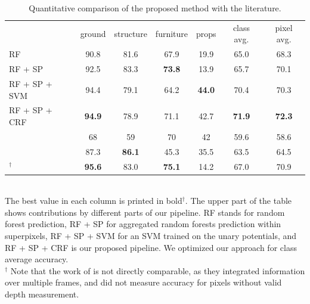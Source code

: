 \begin{table}[t]
    \caption{Quantitative comparison of the proposed method with the
    literature.}
\begin{tabularx}{\linewidth}{@{\extracolsep{\fill}}l@{}cccccc}
\toprule
                        & \footnotesize{ground}        &  \footnotesize{structure}    & \footnotesize{furniture}     & \footnotesize{props}         & \footnotesize{class avg.}   & \footnotesize{pixel avg.}\\
\cmidrule{1-7}

RF                              &         90.8  &   81.6        & 67.9          & 19.9          &  65.0        &  68.3 \\
RF + SP                         &         92.5  &   83.3        & \textbf{73.8} & 13.9          &  65.7        &  70.1 \\ 
RF + SP + SVM                   &         94.4  &   79.1        & 64.2          & \textbf{44.0} &  70.4        &  70.3 \\
RF + SP + CRF                   & \textbf{94.9} &   78.9        &          71.1 & 42.7          &\textbf{71.9} &  \textbf{72.3} \\
\cmidrule{1-7}
\citet{SilbermanECCV12}         &         68    &   59          & 70           & 42            &  59.6        & 58.6 \\
\citet{couprie-iclr-13}         &         87.3  & \textbf{86.1} & 45.3         & 35.5          &  63.5        & 64.5 \\
\cmidrule{1-7}
\citet{stueckler2013}$^\dagger$ & \textbf{95.6} &   83.0        & \textbf{75.1}& 14.2          &  67.0        & 70.9 \\

\bottomrule
\end{tabularx}
\quad\\The best value in each column is printed in bold$^\dagger$. The upper part of
the table shows contributions by different parts of our pipeline. RF stands for random forest prediction, RF + SP for aggregated
random forests prediction within superpixels, RF + SP + SVM for an SVM trained on the unary potentials, and RF + SP + CRF is
our proposed pipeline. We optimized our approach for class average
accuracy.\\
$^\dagger$ \footnotesize Note that the work of \citet{stueckler2013} is not directly
comparable, as they integrated information over multiple frames, and did not
measure accuracy for pixels without valid depth measurement.
\end{table}

